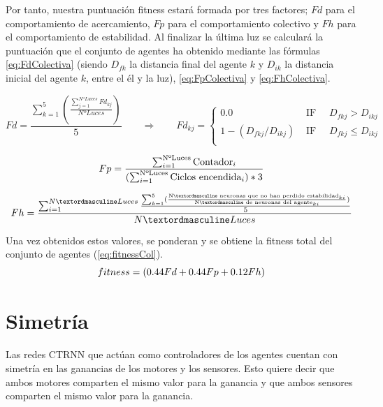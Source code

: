 Por tanto, nuestra puntuación fitness estará formada por tres factores; $Fd$ para el comportamiento de acercamiento, $Fp$ para el comportamiento colectivo y $Fh$ para el comportamiento de estabilidad. Al finalizar la última luz se calculará la puntuación
que el conjunto de agentes ha obtenido mediante las fórmulas \ref{eq:FdColectiva} (siendo $D_{fk}$ la distancia final del agente $k$ y $D_{ik}$ la distancia inicial del agente $k$, entre el él y la luz), \ref{eq:FpColectiva} y \ref{eq:FhColectiva}.

\begin{equation} \label{eq:FdColectiva}
	Fd = \frac{\sum_{k=1}^{5}(\frac{\sum_{j=1}^{NºLuces}Fd_{kj}}{NºLuces})}{5} \qquad \Rightarrow \qquad Fd_{kj}=\begin{cases}
	0.0 & \text{ IF }\quad D_{fkj} > D_{ikj}  \\
	1 - (D_{fkj} / D_{ikj}) & \text{ IF }\quad D_{fkj} \leq D_{ikj} \\
	\end{cases}
\end{equation}

\begin{equation} \label{eq:FpColectiva}
 \centering
		Fp = \frac{\sum_{i= 1}^{\text{NºLuces}}\text{Contador}_{i}}{(\sum_{i =1}^{\text{NºLuces}}\text{Ciclos encendida}_{i}) * 3}
\end{equation}

\begin{equation} \label{eq:FhColectiva}
 \centering
		Fh = \frac{\sum_{i = 1}^{Nº Luces}\frac{\sum_{k=1}^{5}(\frac{\text{Nº neuronas que no han perdido estabilidad}_{ki}}{\text{Nº de neuronas del agente}_{ki}})}{5}}{Nº Luces}
\end{equation}

Una vez obtenidos estos valores, se ponderan y se obtiene la fitness total del conjunto de agentes (\ref{eq:fitnessCol}).
\begin{equation} \label{eq:fitnessCol}
 \centering
	fitness = (0.44Fd + 0.44Fp + 0.12Fh)
\end{equation}

\section{Simetría}
Las redes CTRNN que actúan como controladores de los agentes cuentan con simetría en las ganancias de los motores y los sensores. Esto quiere decir que ambos motores comparten el mismo valor para la ganancia y que ambos sensores
comparten el mismo valor para la ganancia.


